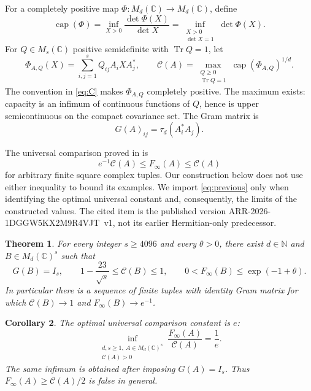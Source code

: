 \documentclass[11pt]{article}
\newtheorem{theorem}{Theorem}
\newtheorem{corollary}[theorem]{Corollary}
\theoremstyle{remark}
\DeclareMathOperator{\Tr}{Tr}
\DeclareMathOperator{\capop}{cap}
\newcommand{\C}{\mathbb C}
\newcommand{\N}{\mathbb N}
\newcommand{\M}{M}
\newcommand{\Finf}{F_{\infty}}
\newcommand{\calC}{\mathcal C}
\begin{document}
For a completely positive map $\Phi:\M_d(\C)\to\M_d(\C)$, define
\begin{equation}
 \capop(\Phi)
  =\inf_{X>0}\frac{\det\Phi(X)}{\det X}
  =\inf_{\substack{X>0\\\det X=1}}\det\Phi(X). \label{eq:capacity}
\end{equation}
For $Q\in\M_s(\C)$ positive semidefinite with $\Tr Q=1$, let
\begin{equation}
 \Phi_{A,Q}(X)=\sum_{i,j=1}^s Q_{ij}A_iXA_j^*,\qquad
 \calC(A)=\max_{\substack{Q\geq0\\\Tr Q=1}}
                    \capop(\Phi_{A,Q})^{1/d}. \label{eq:C}
\end{equation}
The convention in \eqref{eq:C} makes $\Phi_{A,Q}$ completely positive.
The maximum exists: capacity is an infimum of continuous functions
of $Q$, hence is upper semicontinuous on the compact covariance set.
The Gram matrix is
\begin{equation}
 G(A)_{ij}=\tau_d(A_i^*A_j). \label{eq:Gram}
\end{equation}

The universal comparison proved in
\cite[Theorem \emph{Universal comparison}]{ErikssonUniversal} is
\begin{equation}
 e^{-1}\calC(A)\leq\Finf(A)\leq\calC(A) \label{eq:previous}
\end{equation}
for arbitrary finite square complex tuples. Our construction below
does not use either inequality to bound its examples. We import
\eqref{eq:previous} only when identifying the optimal universal
constant and, consequently, the limits of the constructed values.
The cited item is the published version
ARR-2026-1DGGW5KX2M9R4VJT~v1, not its earlier Hermitian-only
predecessor.

\begin{theorem}\label{thm:main}
For every integer $s\geq4096$ and every $\theta>0$, there exist
$d\in\N$ and $B\in\M_d(\C)^s$ such that
\begin{equation}
 G(B)=I_s,\qquad
 1-\frac{23}{\sqrt{s}}\leq\calC(B)\leq1,\qquad
 0<\Finf(B)\leq \exp(-1+\theta). \label{eq:main}
\end{equation}
In particular there is a sequence of finite tuples with identity
Gram matrix for which $\calC(B)\to1$ and $\Finf(B)\to e^{-1}$.
\end{theorem}

\begin{corollary}\label{cor:sharp}
The optimal universal comparison constant is $e$:
\begin{equation}
 \inf_{\substack{d,s\geq1,\ A\in\M_d(\C)^s\\\calC(A)>0}}
       \frac{\Finf(A)}{\calC(A)}=\frac1e. \label{eq:sharp}
\end{equation}
The same infimum is obtained after imposing $G(A)=I_s$.
Thus $\Finf(A)\geq\calC(A)/2$ is false in general.
\end{corollary}
\end{document}
